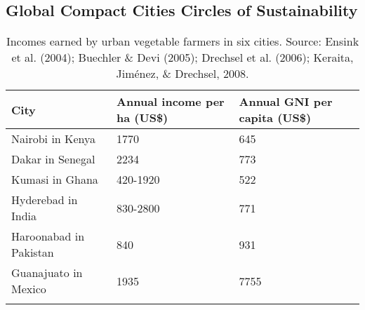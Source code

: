 \begin{landscape}

\chapter{Global Compact Cities Circles of Sustainability} %

\label{AppendixC} %

\begin{table}[th]
\caption{Incomes earned by urban vegetable farmers in six cities. Source: Ensink et al. (2004); Buechler \& Devi (2005); Drechsel et al. (2006); Keraita, Jiménez, \& Drechsel, 2008.}
\begin{center}
\begin{tabular}{ p{} p{} p{} } 
\hline
City & Annual income per ha (US\$) & Annual GNI per capita (US\$) \\
\hline
Nairobi in Kenya & 1770 & 645 \\
Dakar in Senegal & 2234 & 773 \\
Kumasi in Ghana & 420-1920 & 522 \\
Hyderebad in India & 830-2800 & 771 \\
Haroonabad in Pakistan & 840 & 931 \\
Guanajuato in Mexico & 1935 & 7755 \\
\hline
\label{tbl:incomesByUfarmens}
\end{tabular}
\end{center}
\end{table}

\end{landscape}